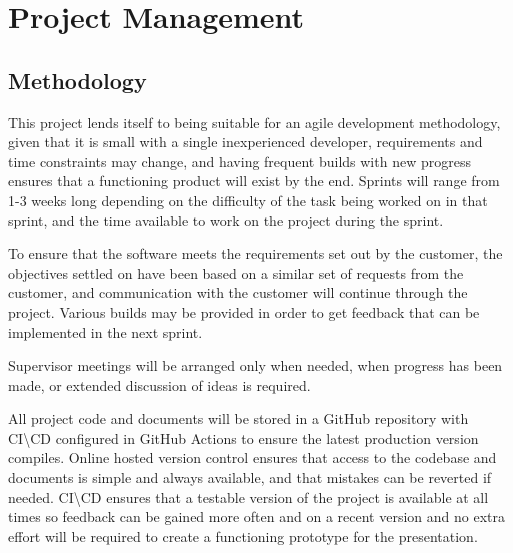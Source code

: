 \section{Project Management} \label{specificationprojectmanagement}
\subsection{Methodology}
This project lends itself to being suitable for an agile development methodology, given that it is small with a single inexperienced developer, requirements and time constraints may change, and having frequent builds with new progress ensures that a functioning product will exist by the end. Sprints will range from 1-3 weeks long depending on the difficulty of the task being worked on in that sprint, and the time available to work on the project during the sprint. 

To ensure that the software meets the requirements set out by the customer, the objectives settled on have been based on a similar set of requests from the customer, and communication with the customer will continue through the project. Various builds may be provided in order to get feedback that can be implemented in the next sprint.

Supervisor meetings will be arranged only when needed, when progress has been made, or extended discussion of ideas is required.

All project code and documents will be stored in a GitHub repository with CI\textbackslash CD configured in GitHub Actions to ensure the latest production version compiles. Online hosted version control ensures that access to the codebase and documents is simple and always available, and that mistakes can be reverted if needed. CI\textbackslash CD ensures that a testable version of the project is available at all times so feedback can be gained more often and on a recent version and no extra effort will be required to create a functioning prototype for the presentation.

